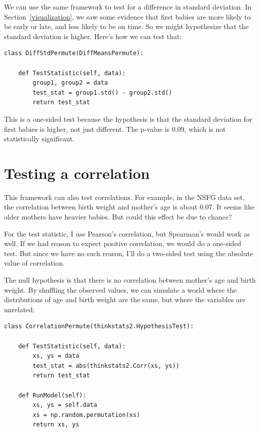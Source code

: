 \documentclass[12pt]{book}
\begin{document}
We can use the same framework to test for a difference in standard
deviation.  In Section~\ref{visualization}, we saw some evidence that
first babies are more likely to be early or late, and less likely to
be on time.  So we might hypothesize that the standard deviation is
higher.  Here's how we can test that:

\begin{verbatim}
class DiffStdPermute(DiffMeansPermute):

    def TestStatistic(self, data):
        group1, group2 = data
        test_stat = group1.std() - group2.std()
        return test_stat
\end{verbatim}

This is a one-sided test because the hypothesis is that the standard
deviation for first babies is higher, not just different.  The p-value
is 0.09, which is not statistically significant.
   


\section{Testing a correlation}
\label{corrtest}

This framework can also test correlations.  For example, in the NSFG
data set, the correlation between birth weight and mother's age is
about 0.07.  It seems like older mothers have heavier babies.  But
could this effect be due to chance?

For the test statistic, I use
Pearson's correlation, but Spearman's would work as well.
If we had reason to expect positive correlation, we would do a
one-sided test.  But since we have no such reason, I'll
do a two-sided test using the absolute value of correlation.

The null hypothesis is that there is no correlation between mother's
age and birth weight.  By shuffling the observed values, we can
simulate a world where the distributions of age and
birth weight are the same, but where the variables are unrelated:

\begin{verbatim}
class CorrelationPermute(thinkstats2.HypothesisTest):

    def TestStatistic(self, data):
        xs, ys = data
        test_stat = abs(thinkstats2.Corr(xs, ys))
        return test_stat

    def RunModel(self):
        xs, ys = self.data
        xs = np.random.permutation(xs)
        return xs, ys
\end{verbatim}
\end{document}
